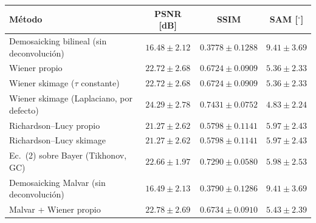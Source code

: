 \begin{tabular}{lccc}
\toprule
Método & PSNR [dB] & SSIM & SAM [$^\circ$] \\
\midrule
Demosaicking bilineal (sin deconvolución) & $16.48 \pm 2.12$ & $0.3778 \pm 0.1288$ & $9.41 \pm 3.69$ \\
Wiener propio & $22.72 \pm 2.68$ & $0.6724 \pm 0.0909$ & $5.36 \pm 2.33$ \\
Wiener skimage ($\tau$ constante) & $22.72 \pm 2.68$ & $0.6724 \pm 0.0909$ & $5.36 \pm 2.33$ \\
Wiener skimage (Laplaciano, por defecto) & $24.29 \pm 2.78$ & $0.7431 \pm 0.0752$ & $4.83 \pm 2.24$ \\
Richardson--Lucy propio & $21.27 \pm 2.62$ & $0.5798 \pm 0.1141$ & $5.97 \pm 2.43$ \\
Richardson--Lucy skimage & $21.27 \pm 2.62$ & $0.5798 \pm 0.1141$ & $5.97 \pm 2.43$ \\
Ec.~(2) sobre Bayer (Tikhonov, GC) & $22.66 \pm 1.97$ & $0.7290 \pm 0.0580$ & $5.98 \pm 2.53$ \\
\midrule
Demosaicking Malvar (sin deconvolución) & $16.49 \pm 2.13$ & $0.3790 \pm 0.1286$ & $9.41 \pm 3.69$ \\
Malvar + Wiener propio & $22.78 \pm 2.69$ & $0.6734 \pm 0.0910$ & $5.43 \pm 2.39$ \\
\bottomrule
\end{tabular}
